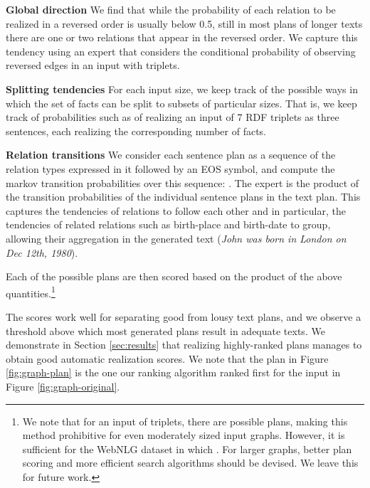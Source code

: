 \documentclass[11pt,a4paper]{article}
\begin{document}
\noindent\textbf{Global direction} 
We find that while the probability of each relation to be realized in a reversed order is usually below 0.5, still in most plans of longer texts there are one or two relations that appear in the reversed order. 
We capture this tendency using an expert that considers the conditional probability  of observing  reversed edges in an input with  triplets.

\noindent\textbf{Splitting tendencies}
For each input size, we keep track of the possible ways in which the set of facts can be split to subsets of particular sizes. 
That is, we keep track of probabilities such as  of realizing an input of 7 RDF triplets as three sentences, each realizing the corresponding number of facts.

\noindent\textbf{Relation transitions}
We consider each sentence plan as a sequence of the relation types expressed in it  followed by an EOS symbol, and compute the markov transition probabilities over this sequence: . The expert is the product of the transition probabilities of the individual sentence plans in the text plan.
This captures the tendencies of relations to follow each other and in particular, the tendencies of related relations such as birth-place and birth-date to group, allowing their aggregation in the generated text (\emph{John was born in London on Dec 12th, 1980}).


Each of the possible plans are then scored based on the product of the above quantities.\footnote{We note that for an input of  triplets, there are  possible plans,
making this method prohibitive for even moderately sized input graphs. However, it is sufficient for the WebNLG dataset in which . For larger graphs, better plan scoring and more efficient search algorithms should be devised. We leave this for future work.}

The scores work well for separating good from lousy text plans, 
and we observe a threshold above which most generated plans result in adequate texts. 
We demonstrate in Section \ref{sec:results} that realizing highly-ranked plans manages to obtain good automatic realization scores.
We note that the plan in Figure \ref{fig:graph-plan} is the one our ranking algorithm ranked first for the input in Figure  \ref{fig:graph-original}.
\end{document}
